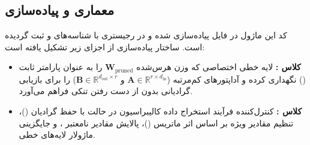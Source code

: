 \subsection{معماری و پیاده‌سازی}
کد این ماژول در فایل  پیاده‌سازی شده و در رجیستری با شناسه‌های  و  ثبت گردیده است. ساختار پیاده‌سازی از اجزای زیر تشکیل یافته است:
\begin{itemize}
    \item \textbf{کلاس :} لایه خطی اختصاصی که وزن هرس‌شده $\mathbf{W}_{\text{pruned}}$ را به عنوان پارامتر ثابت () نگهداری کرده و آداپتورهای کم‌مرتبه  ($\mathbf{A} \in \mathbb{R}^{r \times d_{\text{in}}}$ و $\mathbf{B} \in \mathbb{R}^{d_{\text{out}} \times r}$) را برای بازیابی گرادیانی بدون از دست رفتن تنکی فراهم می‌آورد.
    \item \textbf{کلاس :} کنترل‌کننده فرآیند استخراج داده کالیبراسیون در حالت  با حفظ گرادیان ()، تنظیم مقادیر ویژه بر اساس اثر ماتریس ()، پالایش مقادیر نامعتبر ، و جایگزینی ماژولار لایه‌های خطی.
\end{itemize}

